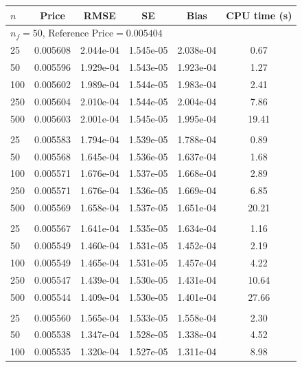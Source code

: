 \begin{table}[tph]
  \centering
  \begin{tabular}{lccccc}
    \hline\hline
    $n$ & Price & RMSE & SE & Bias & CPU time (s) \\
    \hline
    \multicolumn{6}{l}{$n_f = 50$, $\text{Reference Price} = 0.005404$} \\
      25 & 0.005608 & 2.044e-04 & 1.545e-05 & 2.038e-04 & 0.67 \\
      50 & 0.005596 & 1.929e-04 & 1.543e-05 & 1.923e-04 & 1.27 \\
     100 & 0.005602 & 1.989e-04 & 1.544e-05 & 1.983e-04 & 2.41 \\
     250 & 0.005604 & 2.010e-04 & 1.544e-05 & 2.004e-04 & 7.86 \\
     500 & 0.005603 & 2.001e-04 & 1.545e-05 & 1.995e-04 & 19.41 \\
    \addlinespace
    \multicolumn{6}{l}{$n_f = 100$, $\text{Reference Price} = 0.005404$} \\
      25 & 0.005583 & 1.794e-04 & 1.539e-05 & 1.788e-04 & 0.89 \\
      50 & 0.005568 & 1.645e-04 & 1.536e-05 & 1.637e-04 & 1.68 \\
     100 & 0.005571 & 1.676e-04 & 1.537e-05 & 1.668e-04 & 2.89 \\
     250 & 0.005571 & 1.676e-04 & 1.536e-05 & 1.669e-04 & 6.85 \\
     500 & 0.005569 & 1.658e-04 & 1.537e-05 & 1.651e-04 & 20.21 \\
    \addlinespace
    \multicolumn{6}{l}{$n_f = 200$, $\text{Reference Price} = 0.005404$} \\
      25 & 0.005567 & 1.641e-04 & 1.535e-05 & 1.634e-04 & 1.16 \\
      50 & 0.005549 & 1.460e-04 & 1.531e-05 & 1.452e-04 & 2.19 \\
     100 & 0.005549 & 1.465e-04 & 1.531e-05 & 1.457e-04 & 4.22 \\
     250 & 0.005547 & 1.439e-04 & 1.530e-05 & 1.431e-04 & 10.64 \\
     500 & 0.005544 & 1.409e-04 & 1.530e-05 & 1.401e-04 & 27.66 \\
    \addlinespace
    \multicolumn{6}{l}{$n_f = 400$, $\text{Reference Price} = 0.005404$} \\
      25 & 0.005560 & 1.565e-04 & 1.533e-05 & 1.558e-04 & 2.30 \\
      50 & 0.005538 & 1.347e-04 & 1.528e-05 & 1.338e-04 & 4.52 \\
     100 & 0.005535 & 1.320e-04 & 1.527e-05 & 1.311e-04 & 8.98 \\

\end{tabular}
\end{table}
